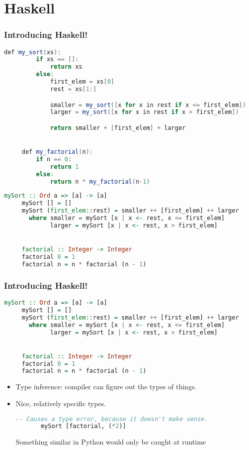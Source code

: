 \documentclass{beamer}
\begin{document}
\section{Haskell}

\begin{frame}[fragile]
  \frametitle{Introducing Haskell!}
  \pause
  \begin{lstlisting}[frame=single, language=Java, breaklines=true, basicstyle=\ttfamily\tiny]
     def my_sort(xs):
         if xs == []:
             return xs
         else:
             first_elem = xs[0]
             rest = xs[1:]

             smaller = my_sort([x for x in rest if x <= first_elem])
             larger = my_sort([x for x in rest if x > first_elem])

             return smaller + [first_elem] + larger


     def my_factorial(n):
         if n == 0:
             return 1
         else:
             return n * my_factorial(n-1)
  \end{lstlisting}

  \pause

  \begin{lstlisting}[frame=single, language=Haskell, breaklines=true, basicstyle=\ttfamily\tiny]
     mySort :: Ord a => [a] -> [a]
     mySort [] = []
     mySort (first_elem::rest) = smaller ++ [first_elem] ++ larger
       where smaller = mySort [x | x <- rest, x <= first_elem]
             larger = mySort [x | x <- rest, x > first_elem]


     factorial :: Integer -> Integer
     factorial 0 = 1
     factorial n = n * factorial (n - 1)
  \end{lstlisting}
\end{frame}

\begin{frame}[fragile]
    \frametitle{Introducing Haskell!}
    \begin{lstlisting}[frame=single, language=Haskell, breaklines=true, basicstyle=\ttfamily\tiny]
     mySort :: Ord a => [a] -> [a]
     mySort [] = []
     mySort (first_elem::rest) = smaller ++ [first_elem] ++ larger
       where smaller = mySort [x | x <- rest, x <= first_elem]
             larger = mySort [x | x <- rest, x > first_elem]


     factorial :: Integer -> Integer
     factorial 0 = 1
     factorial n = n * factorial (n - 1)
   \end{lstlisting}

   \begin{itemize}
   \item Type inference: compiler can figure out the types of things.
   \item Nice, relatively specific types.
     \begin{lstlisting}[frame=single, language=Haskell, breaklines=true, basicstyle=\ttfamily\tiny]
       -- Causes a type error, because it doesn't make sense.
       mySort [factorial, (*2)]
     \end{lstlisting}

     Something similar in Python would only be caught at runtime
   \end{itemize}
\end{frame}
\end{document}
